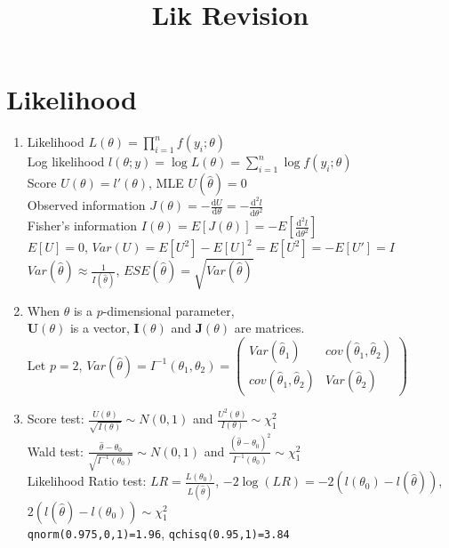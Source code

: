 \documentclass[11pt,a4paper]{article}
\title{Lik Revision}
\begin{document}
\section*{Likelihood}

\begin{enumerate}
\item Likelihood $\displaystyle L(\theta) = \prod_{i=1}^n f(y_i; \theta)$ \\
Log likelihood $\displaystyle l(\theta; y) = \log L(\theta) = \sum_{i=1}^n \log f(y_i; \theta)$ \\
Score $U(\theta) = l'(\theta)$, MLE $U \left( \hat{\theta} \right) = 0$ \\
Observed information $\displaystyle J(\theta) = - \frac{\mathrm{d} U}{\mathrm{d} \theta} = - \frac{\mathrm{d}^2 l}{\mathrm{d} \theta^2}$ \\
Fisher's information $\displaystyle I(\theta) = E[J(\theta)] = - E \left[ \frac{\mathrm{d}^2 l}{\mathrm{d} \theta^2} \right]$ \\
$E[U] = 0$, $\displaystyle Var(U) = E[U^2] - E[U]^2 = E[U^2] = -E[U'] = I$ \\
$\displaystyle Var \left( \hat{\theta} \right) \approx \frac{1}{I \left( \hat{\theta} \right)}$, $\displaystyle ESE \left( \hat{\theta} \right) = \sqrt{Var \left( \hat{\theta} \right)}$

\item When $\theta$ is a $p$-dimensional parameter, \\
$\mathbf{U}(\theta)$ is a vector, $\mathbf{I}(\theta)$ and $\mathbf{J}(\theta)$ are matrices. \\
Let $p=2$, $Var(\hat{\theta}) = I^{-1}(\theta_1, \theta_2) = \begin{pmatrix}
Var \left( \hat{\theta}_1 \right) & cov \left( \hat{\theta}_1, \hat{\theta}_2 \right) \\
cov \left( \hat{\theta}_1, \hat{\theta}_2 \right) & Var \left( \hat{\theta}_2 \right)
\end{pmatrix}$

\item Score test: $\displaystyle \frac{U(\theta)}{\sqrt{I(\theta)}} \sim N(0,1)$ and $\displaystyle \frac{U^2(\theta)}{I(\theta)} \sim \chi_1^2$ \\
Wald test: $\displaystyle \frac{\hat{\theta} - \theta_0}{\sqrt{I^{-1}(\theta_0)}} \sim N(0,1)$ and $\displaystyle \frac{\left( \hat{\theta} - \theta_0 \right)^2}{I^{-1}(\theta_0)} \sim \chi_1^2$ \\
Likelihood Ratio test: $\displaystyle LR = \frac{L(\theta_0)}{L(\hat{\theta})}$, $-2 \log (LR) = -2 (l(\theta_0) - l(\hat{\theta}))$, 
$2 \left( l \left( \hat{\theta} \right) - l(\theta_0) \right) \sim \chi_1^2$ \\
\texttt{qnorm(0.975,0,1)=1.96}, \texttt{qchisq(0.95,1)=3.84}


\end{enumerate}
\end{document}
